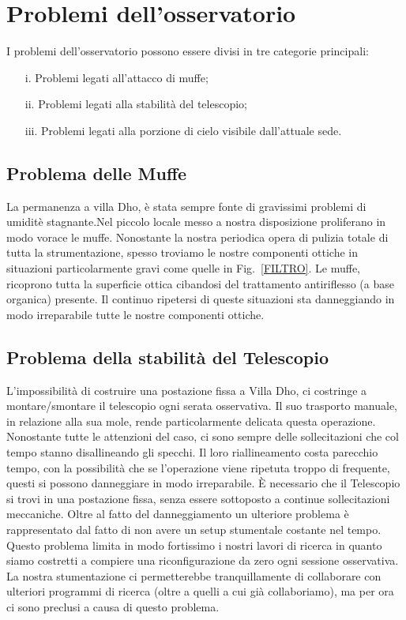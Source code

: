\documentclass[a4paper,12pt]{article}
\begin{document}
\section{Problemi dell'osservatorio}
I problemi dell'osservatorio possono essere divisi in tre categorie principali:
\begin{itemize}
	\item[i.] Problemi legati all'attacco di muffe;
	\item[ii.] Problemi legati alla stabilit\`a del telescopio;
	\item[iii.] Problemi legati alla porzione di cielo visibile dall'attuale sede.
\end{itemize}

\subsection{Problema delle Muffe}
La permanenza a villa Dho, \`e stata sempre fonte di gravissimi problemi di umidit\`e stagnante.Nel piccolo locale messo a nostra disposizione proliferano in modo vorace le muffe. Nonostante la nostra periodica opera di pulizia totale di tutta la strumentazione, spesso troviamo le nostre componenti ottiche in situazioni particolarmente gravi come quelle in Fig.~\ref{FILTRO}. Le muffe, ricoprono tutta la superficie ottica cibandosi del trattamento antiriflesso (a base organica) presente. Il continuo ripetersi di queste situazioni sta danneggiando in modo irreparabile tutte le nostre componenti ottiche.
\subsection{Problema della stabilit\`a del Telescopio}
L'impossibilit\`a di costruire una postazione fissa a Villa Dho, ci costringe a montare/smontare il telescopio ogni serata osservativa. Il suo trasporto manuale, in relazione alla sua mole, rende particolarmente delicata questa operazione. Nonostante tutte le attenzioni del caso, ci sono sempre delle sollecitazioni che col tempo stanno disallineando gli specchi. Il loro riallineamento costa parecchio tempo, con la possibilit\`a che se l'operazione viene ripetuta troppo di frequente, questi si possono danneggiare in modo irreparabile. \`E necessario che il Telescopio si trovi in una postazione fissa, senza essere sottoposto a continue sollecitazioni meccaniche.
Oltre al fatto del danneggiamento un ulteriore problema \`e rappresentato dal fatto di non avere un setup stumentale costante nel tempo. Questo problema limita in modo fortissimo i nostri lavori di ricerca in quanto siamo costretti a compiere una riconfigurazione da zero ogni sessione osservativa. La nostra stumentazione ci permetterebbe tranquillamente di collaborare con ulteriori programmi di ricerca (oltre a quelli a cui gi\`a collaboriamo), ma per ora ci sono preclusi a causa di questo problema.
\end{document}
